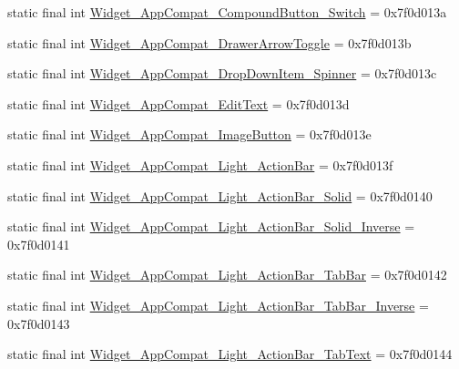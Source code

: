 \begin{DoxyCompactItemize}
\item 
static final int \mbox{\hyperlink{classcom_1_1synnapps_1_1carouselview_1_1_r_1_1style_a3e55477af31e1edc8ab2c2bbc5cc387f}{Widget\+\_\+\+App\+Compat\+\_\+\+Compound\+Button\+\_\+\+Switch}} = 0x7f0d013a
\item 
static final int \mbox{\hyperlink{classcom_1_1synnapps_1_1carouselview_1_1_r_1_1style_a284a2c1fc3f5ae98d54e7dc675b5652b}{Widget\+\_\+\+App\+Compat\+\_\+\+Drawer\+Arrow\+Toggle}} = 0x7f0d013b
\item 
static final int \mbox{\hyperlink{classcom_1_1synnapps_1_1carouselview_1_1_r_1_1style_ab9618b87d4eb38039aa29a6972493857}{Widget\+\_\+\+App\+Compat\+\_\+\+Drop\+Down\+Item\+\_\+\+Spinner}} = 0x7f0d013c
\item 
static final int \mbox{\hyperlink{classcom_1_1synnapps_1_1carouselview_1_1_r_1_1style_abc9bc18e53a2772d7ac7560bd334ca88}{Widget\+\_\+\+App\+Compat\+\_\+\+Edit\+Text}} = 0x7f0d013d
\item 
static final int \mbox{\hyperlink{classcom_1_1synnapps_1_1carouselview_1_1_r_1_1style_a0b84e5c2002f1759e4de7bcbf6545047}{Widget\+\_\+\+App\+Compat\+\_\+\+Image\+Button}} = 0x7f0d013e
\item 
static final int \mbox{\hyperlink{classcom_1_1synnapps_1_1carouselview_1_1_r_1_1style_abb57a2a6337305779da531dc89220e7a}{Widget\+\_\+\+App\+Compat\+\_\+\+Light\+\_\+\+Action\+Bar}} = 0x7f0d013f
\item 
static final int \mbox{\hyperlink{classcom_1_1synnapps_1_1carouselview_1_1_r_1_1style_a0707620a3cabeb88b5d8e00b337c7157}{Widget\+\_\+\+App\+Compat\+\_\+\+Light\+\_\+\+Action\+Bar\+\_\+\+Solid}} = 0x7f0d0140
\item 
static final int \mbox{\hyperlink{classcom_1_1synnapps_1_1carouselview_1_1_r_1_1style_aef77fdc4c60813c50f3e4eba87b0fea5}{Widget\+\_\+\+App\+Compat\+\_\+\+Light\+\_\+\+Action\+Bar\+\_\+\+Solid\+\_\+\+Inverse}} = 0x7f0d0141
\item 
static final int \mbox{\hyperlink{classcom_1_1synnapps_1_1carouselview_1_1_r_1_1style_a287835696aabbeca3ca6b5f061e4c314}{Widget\+\_\+\+App\+Compat\+\_\+\+Light\+\_\+\+Action\+Bar\+\_\+\+Tab\+Bar}} = 0x7f0d0142
\item 
static final int \mbox{\hyperlink{classcom_1_1synnapps_1_1carouselview_1_1_r_1_1style_af5be6cd7ca07872bfa93154a3d9f91e1}{Widget\+\_\+\+App\+Compat\+\_\+\+Light\+\_\+\+Action\+Bar\+\_\+\+Tab\+Bar\+\_\+\+Inverse}} = 0x7f0d0143
\item 
static final int \mbox{\hyperlink{classcom_1_1synnapps_1_1carouselview_1_1_r_1_1style_a193f00cf3681f2f6d72c5286e93c0d6c}{Widget\+\_\+\+App\+Compat\+\_\+\+Light\+\_\+\+Action\+Bar\+\_\+\+Tab\+Text}} = 0x7f0d0144

\end{DoxyCompactItemize}
